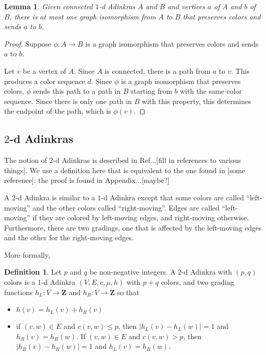 \documentclass[12pt,twoside,singlespace]{article}
\numberwithin{equation}{section}
\newtheorem{lem}[equation]{Lemma}
\theoremstyle{definition}
\newtheorem{definition}[equation]{Definition}
\newcommand{\ZZ}{\mathbf{Z}}
\begin{document}
\begin{lem}
\label{lem:uniqueiso}
Given connected $1$-d Adinkras $A$ and $B$ and vertices $a$ of $A$ and $b$ of $B$, there is at most one graph isomorphism from $A$ to $B$ that preserves colors and sends $a$ to $b$.
\end{lem}
\begin{proof}
Suppose $\phi:A\to B$ is a graph isomorphism that preserves colors and sends $a$ to $b$.

Let $v$ be a vertex of $A$. Since $A$ is connected, there is a path from $a$ to $v$.  This produces a color sequence $d$.  Since $\phi$ is a graph isomorphism that preserves colors, $\phi$ sends this path to a path in $B$ starting from $b$ with the same color sequence.  Since there is only one path in $B$ with this property, this determines the endpoint of the path, which is $\phi(v)$.
\end{proof}




\subsection{$2$-d Adinkras}
The notion of $2$-d Adinkras is described in Ref...[fill in references to various things].  We use a definition here that is equivalent to the one found in [some reference]: the proof is found in Appendix...[maybe?]

A $2$-d Adinkra is similar to a $1$-d Adinkra except that some colors are called ``left-moving'' and the other colors called ``right-moving''.  Edges are called ``left-moving'' if they are colored by left-moving edges, and right-moving otherwise.  Furthermore, there are two gradings, one that is affected by the left-moving edges and the other for the right-moving edges.

More formally,
\begin{definition}
Let $p$ and $q$ be non-negative integers.   A 2-d Adinkra with $(p,q)$ colors is a 1-d Adinkra $(V,E,c,\mu,h)$ with $p+q$ colors, and two grading functions $h_L:V\to \ZZ$ and $h_R:V\to \ZZ$ so that
\begin{itemize}
\item $h(v)=h_L(v)+h_R(v)$
\item if $(v,w)\in E$ and $c(v,w)\le p$, then $|h_L(v)-h_L(w)|=1$ and $h_R(v)=h_R(w)$.  If $(v,w)\in E$ and $c(v,w)>p$, then $|h_R(v)-h_R(w)|=1$ and $h_L(v)=h_R(w)$.
\end{itemize}
\end{definition}
\end{document}
